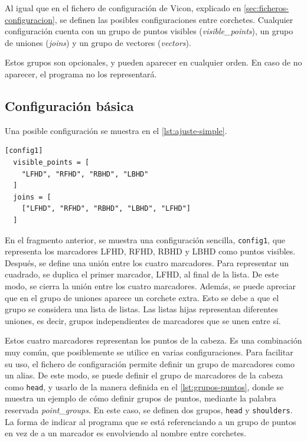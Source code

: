 Al igual que en el fichero de configuración de Vicon, explicado en \autoref{sec:ficheros-configuracion}, se definen las posibles configuraciones entre corchetes. Cualquier configuración cuenta con un grupo de puntos visibles (\textit{visible\_points}), un grupo de uniones (\textit{joins}) y un grupo de vectores (\textit{vectors}).

Estos grupos son opcionales, y pueden aparecer en cualquier orden. En caso de no aparecer, el programa no los representará.

\subsection{Configuración básica}

Una posible configuración se muestra en el \autoref{lst:ajuste-simple}.

\begin{lstlisting}[style=mystyle, caption={Ejemplo simple de un fichero de configuración}, label={lst:ajuste-simple}]
[config1]
  visible_points = [
    "LFHD", "RFHD", "RBHD", "LBHD"
  ]
  joins = [
    ["LFHD", "RFHD", "RBHD", "LBHD", "LFHD"]
  ]
\end{lstlisting}

En el fragmento anterior, se muestra una configuración sencilla, \texttt{config1}, que representa los marcadores \ac{LFHD}, \ac{RFHD}, \ac{RBHD} y \ac{LBHD} como puntos visibles. Después, se define una unión entre los cuatro marcadores. Para representar un cuadrado, se duplica el primer marcador, \ac{LFHD}, al final de la lista. De este modo, se cierra la unión entre los cuatro marcadores. Además, se puede apreciar que en el grupo de uniones aparece un corchete extra. Esto se debe a que el grupo se considera una lista de listas. Las listas hijas representan diferentes uniones, es decir, grupos independientes de marcadores que se unen entre sí.

Estos cuatro marcadores representan los puntos de la cabeza. Es una combinación muy común, que posiblemente se utilice en varias configuraciones. Para facilitar su uso, el fichero de configuración permite definir un grupo de marcadores como un alias. De este modo, se puede definir el grupo de marcadores de la cabeza como \texttt{head}, y usarlo de la manera definida en el \autoref{lst:grupos-puntos}, donde se muestra un ejemplo de cómo definir grupos de puntos, mediante la palabra reservada \textit{point\_groups}. En este caso, se definen dos grupos, \texttt{head} y \texttt{shoulders}. La forma de indicar al programa que se está referenciando a un grupo de puntos en vez de a un marcador es envolviendo al nombre entre corchetes.

